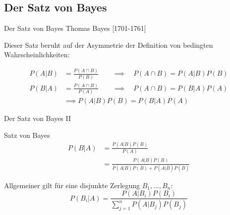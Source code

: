 \documentclass[
  10pt,
  ignorenonframetext,
]{beamer}
\begin{document}
\subsection{Der Satz von Bayes}\label{der-satz-von-bayes}

\begin{frame}{Der Satz von Bayes}
\label{der-satz-von-bayes-1}
Thomas Bayes {[}1701-1761{]}

Dieser Satz beruht auf der Asymmetrie der Definition von bedingten
Wahrscheinlichkeiten:

\begin{align*}
P(A|B) & = \frac{P(A \cap B)}{P(B)} \qquad \implies \quad
P(A \cap B) = P(A|B)P(B)\\
P(B|A) & =  \frac{P(A \cap B)}{P(A)} \qquad \implies \quad
P(A \cap B) = P(B|A)P(A)\\
& \implies P(A|B)P(B) = P(B|A)P(A)
\end{align*}
\end{frame}

\begin{frame}{Der Satz von Bayes II}
\label{der-satz-von-bayes-ii}
\begin{block}{Satz von Bayes}
\label{satz-von-bayes}
\begin{align*}
P(B|A)&= \frac{P(A|B)P(B)}{P(A)} \\
      &= \frac{P(A|B)P(B)}{P(A|B)P(B) + P(A|\bar{B})P(\bar{B})}
\end{align*}
\end{block}

Allgemeiner gilt für eine disjunkte Zerlegung \(B_1, ..., B_n\):\\
\[P(B_i|A) = \frac{P(A|B_i)P(B_i)}{\sum_{j=1}^n P(A|B_j)P(B_j)}\]
\end{frame}
\end{document}
